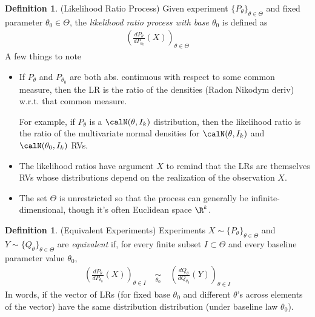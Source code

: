 \documentclass[12pt]{article}
\theoremstyle{plain}
\theoremstyle{definition}
\newtheorem{defn}[thm]{Definition}
\theoremstyle{remark}
\begin{document}
\begin{defn}(Likelihood Ratio Process)
Given experiment $\{P_\theta\}_{\theta\in \Theta}$ and fixed parameter
$\theta_0\in \Theta$, the \emph{likelihood ratio process with
base $\theta_0$} is defined as
\begin{align*}
  \left(
  \frac{dP_\theta}{dP_{\theta_0}}(X)
  \right)_{\theta\in \Theta}
\end{align*}
A few things to note
\begin{itemize}
  \item If $P_\theta$ and $P_{\theta_0}$ are both
    abs. continuous with respect to some common measure, then the
    LR is the ratio of the densities (Radon Nikodym deriv) w.r.t.
    that common measure.

    For example, if $P_\theta$ is a $\calN(\theta,I_k)$ distribution, then the
    likelihood ratio is the ratio of the multivariate normal densities
    for $\calN(\theta,I_k)$ and $\calN(\theta_0,I_k)$ RVs.
  \item The likelihood ratios have argument $X$ to remind that the LRs
    are themselves RVs whose distributions depend on the realization of
    the observation $X$.
  \item The set $\Theta$ is unrestricted so that the process can
    generally be infinite-dimensional, though it's often Euclidean space
    $\R^k$.
\end{itemize}
\end{defn}

\clearpage
\begin{defn}(Equivalent Experiments)
Experiments $X\sim\{P_\theta\}_{\theta\in\Theta}$ and
$Y\sim\{Q_\theta\}_{\theta\in\Theta}$ are \emph{equivalent} if,
for every finite subset $I\subset \Theta$ and every baseline parameter
value $\theta_0$,
\begin{align*}
  \left(
  \frac{dP_\theta}{dP_{\theta_0}}(X)
  \right)_{\theta\in I}
  \quad
  \underset{\theta_0}{\sim}
  \quad
  \left(
  \frac{dQ_\theta}{dQ_{\theta_0}}(Y)
  \right)_{\theta\in I}
\end{align*}
In words, if the vector of LRs (for fixed base $\theta_0$ and different
$\theta$'s across elements of the vector) have the same distribution
distribution (under baseline law $\theta_0$).
\end{defn}
\end{document}

